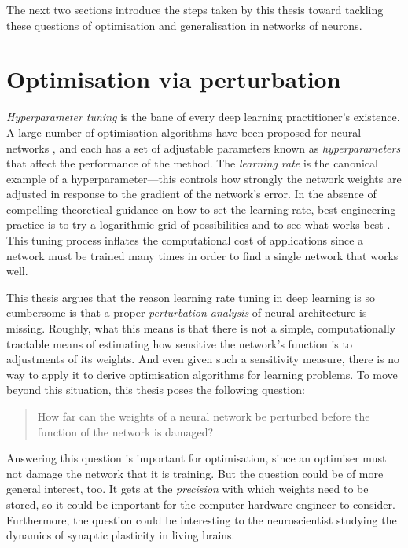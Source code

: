 \begin{refsection}
The next two sections introduce the steps taken by this thesis toward tackling these questions of optimisation and generalisation in networks of neurons.

\section{Optimisation via perturbation}

\textit{Hyperparameter tuning} is the bane of every deep learning practitioner's existence. A large number of optimisation algorithms have been proposed for neural networks \citep{crowded_valley}, and each has a set of adjustable parameters known as \textit{hyperparameters} that affect the performance of the method. The \textit{learning rate} is the canonical example of a hyperparameter---this controls how strongly the network weights are adjusted in response to the gradient of the network's error. In the absence of compelling theoretical guidance on how to set the learning rate, best engineering practice is to try a logarithmic grid of possibilities and to see what works best \citep{Goodfellow-et-al-2016}. This tuning process inflates the computational cost of applications since a network must be trained many times in order to find a single network that works well.

This thesis argues that the reason learning rate tuning in deep learning is so cumbersome is that a proper \textit{perturbation analysis} of neural architecture is missing. Roughly, what this means is that there is not a simple, computationally tractable means of estimating how sensitive the network's function is to adjustments of its weights. And even given such a sensitivity measure, there is no way to apply it to  derive optimisation algorithms for learning problems. To move beyond this situation, this thesis poses the following question:
\begin{quote}
    How far can the weights of a neural network be perturbed before the function of the network is damaged?
\end{quote}

Answering this question is important for optimisation, since an optimiser must not damage the network that it is training. But the question could be of more general interest, too. It gets at the \textit{precision} with which weights need to be stored, so it could be important for the computer hardware engineer to consider. Furthermore, the question could be interesting to the neuroscientist studying the dynamics of synaptic plasticity in living brains.


\end{refsection}
